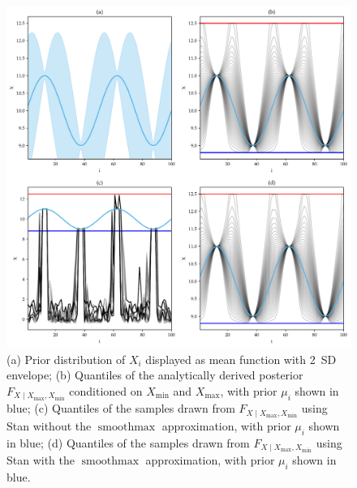 \documentclass[letter]{article}
\makeatletter
\def\maxwidth{\ifdim\Gin@nat@width>\linewidth\linewidth
\else\Gin@nat@width\fi}
\let\Oldincludegraphics\includegraphics
\renewcommand{\includegraphics}[1]{\Oldincludegraphics[width=0.98\maxwidth]{#1}}
\DeclareMathOperator*{\softmax}{smoothmax}
\newcommand{\Xmax}{X_{\max}}
\newcommand{\Xmin}{X_{\min}}
\newcommand{\Fcond}{F_{X \mid \Xmax,\Xmin}}
\makeatother
\begin{document}
        \begin{figure}
\centering
\includegraphics{../figures/toy_quantiles.pdf}
\caption{\label{fig:toy_quantiles}(a) Prior distribution of \(X_i\) displayed as mean function with 2~SD envelope; (b) Quantiles of the analytically derived posterior \(\Fcond\) conditioned on \(\Xmin\) and \(\Xmax\), with prior \(\mu_i\) shown in blue; (c) Quantiles of the samples drawn from \(\Fcond\) using Stan without the \(\softmax\) approximation, with prior \(\mu_i\) shown in blue; (d) Quantiles of the samples drawn from \(\Fcond\) using Stan with the \(\softmax\) approximation, with prior \(\mu_i\) shown in blue.}
\end{figure}
    
\end{document}
